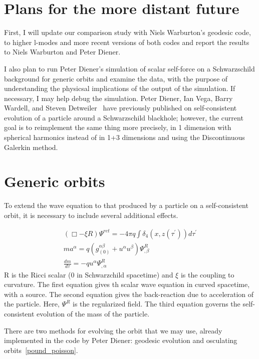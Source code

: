 \section{Plans for the more distant future}
First, I will update our comparison study with Niels Warburton's geodesic code, to higher l-modes and more recent versions of both codes and report the results to Niels Warburton and Peter Diener.  

I also plan to run Peter Diener's simulation of scalar self-force on a Schwarzschild background for generic orbits and examine the data, with the purpose of understanding the physicsal implications of the output of the simulation. If necessary, I may help debug the simulation. Peter Diener, Ian Vega, Barry Wardell, and Steven Detweiler~\cite{diener_vega_wardell_detweiler} have previously published on self-consistent evolution of a particle around a Schwarzschild blackhole; however, the current goal is to reimplement the same thing more precisely, in 1 dimension with spherical harmonics instead of in 1+3 dimensions and using the Discontinuous Galerkin method. 

\section{Generic orbits}
To extend the wave equation to that produced by a particle on a self-consistent orbit, it is necessary to include several additional effects.

\begin{eqnarray}
  (\Box - \xi R)\Psi^{ret} = -4\pi q \int\delta_4(x,z(\tau^\prime))d\tau^\prime\\
    ma^\alpha=q(g^{\alpha\beta}_{(0)}+u^\alpha u^\beta)\Psi^{R}_{,\beta}\\
    \frac{dm}{d\tau}=-q u^\alpha\Psi^R_{,\alpha}
    \label{genericev}
\end{eqnarray}
R is the Ricci scalar (0 in Schwarzchild spacetime) and $\xi$ is the coupling to curvature. The first equation gives th scalar wave equation in curved spacetime, with a source. The second equation gives the back-reaction due to acceleration of the particle. Here, $\Psi^R$ is the regularized field. The third equation governs the self-consistent evolution of the mass of the particle.~\cite{WardellSelfForceReview}

There are two methods for evolving the orbit that we may use, already implemented in the code by Peter Diener: geodesic evolution and osculating orbits~\ref{pound_poisson}.

